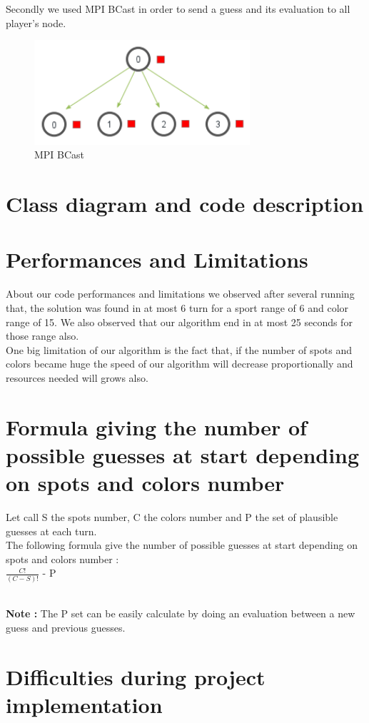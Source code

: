 Secondly we used MPI BCast in order to send a guess and its evaluation to all player's node.

        \begin{figure}[H]
	    \centering
	    \includegraphics[width=8cm] {bcast2.png}
	    \caption{MPI BCast  }
	    \label{plot12}
	\end{figure}

\section{Class diagram and code description}	
\section{Performances and Limitations}
About our code performances and limitations we observed after several running that, the solution was found in at most 6 turn for a sport range of 6 and color range of 15. We also observed that our algorithm end in at most 25 seconds for those range also. \\
One big limitation of our algorithm is the fact that, if the number of spots and colors became huge the speed of our algorithm will decrease proportionally and resources needed will grows also. 


\section{Formula giving the number of possible guesses at start depending on spots and 
colors number}
Let call S the spots number, C the colors number and P the set of plausible guesses at each turn. \\
The following formula give the number of possible guesses at start depending on spots and 
colors number : \\
$ \frac{C!}{(C-S)!}$ - P

\\
\textbf{Note :} The P set can be easily calculate by doing an evaluation between a new guess and previous guesses.

\section{Difficulties during project implementation}
